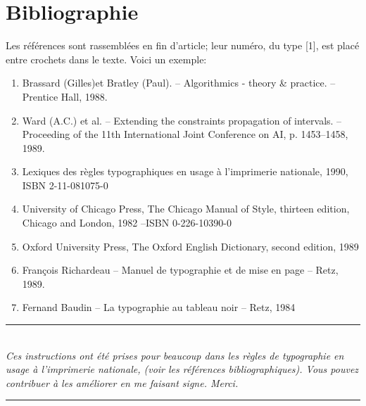 \documentclass[twoside]{article}
\newcommand{\filet}{\noindent\rule[0mm]{\textwidth}{0.2mm}}
\begin{document}
\section*{Bibliographie}

Les r\'ef\'erences sont rassembl\'ees en fin d'article; leur
num\'ero, du type [1], est plac\'e entre crochets dans le texte.
Voici un exemple:

{\small
\begin{enumerate}
\item Brassard (Gilles)et Bratley (Paul). -- Algorithmics - theory \& 
	practice. -- Prentice Hall, 1988.
\item Ward (A.C.) et al. -- Extending the constraints propagation of 
	intervals. -- Proceeding of the 11th International Joint Conference on 
	AI, p. 1453--1458, 1989.

\item Lexiques des r\`egles typographiques en usage \`a l'imprimerie
nationale, 1990, ISBN 2-11-081075-0

\item University of Chicago Press, The Chicago Manual of Style,
thirteen edition, Chicago and London, 1982 --ISBN 0-226-10390-0

\item Oxford University Press, The Oxford English Dictionary, second 
edition, 1989

\item Fran\c cois Richardeau -- Manuel de typographie et de mise en page --
Retz, 1989.

\item Fernand Baudin -- La typographie au tableau noir --  Retz, 1984

\end{enumerate}
}

{\filet
\small\\

{\em Ces instructions ont été prises pour beaucoup dans les règles de
typographie en usage à l'imprimerie nationale, (voir les références
bibliographiques). Vous pouvez contribuer à les améliorer en me
faisant signe. Merci.}\\ \filet } 
\end{document}
